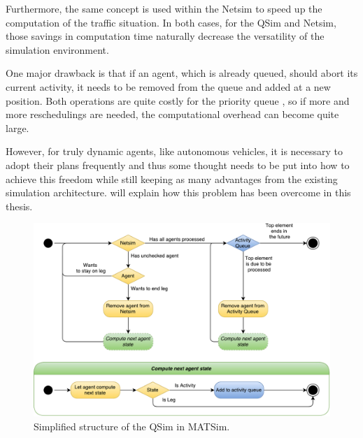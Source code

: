 Furthermore, the same concept is used within the Netsim to speed up the computation
of the traffic situation. In both cases, for the QSim and Netsim, those savings in
computation time naturally decrease the versatility of the simulation environment.

One major drawback is that if an agent, which is already queued, should abort its
current activity, it needs to be removed from the queue and added at a new position.
Both operations are quite costly for the priority queue \citep{JavaPQ}, so
if more and more reschedulings are needed, the computational overhead can become
quite large.

However, for truly dynamic agents, like autonomous vehicles, it is necessary to
adopt their plans frequently and thus some thought needs to be put into how to
achieve this freedom while still keeping as many advantages from the existing
simulation architecture.  will explain how this problem has
been overcome in this thesis.

\begin{figure}
    \centering
    \includegraphics[width=1.0\textwidth]{figures/qsim.pdf}
    \caption{Simplified structure of the QSim in MATSim.}
    \label{fig:qsim}
\end{figure}
